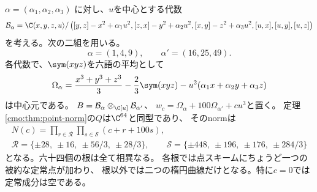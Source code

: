 \begin{example}
\label{cmo:ex:sixty-four}
$\alpha=(\alpha_1,\alpha_2,\alpha_3)$ に対し、$u$を中心とする代数
\[
 \mathcal B_\alpha=\C\langle x,y,z,u\rangle/
 \left([y,z]-x^2+\alpha_1u^2,
       [z,x]-y^2+\alpha_2u^2,
       [x,y]-z^2+\alpha_3u^2,
       [u,x],[u,y],[u,z]\right)
\]
を考える。次の二組を用いる。
\[
 \alpha=(1,4,9),\qquad \alpha'=(16,25,49).
\]
各代数で、$\sym(xyz)$を六語の平均として
\begin{equation}\label{cmo:eq:mixed-center}
 \Omega_\alpha
 =\frac{x^3+y^3+z^3}{3}-\frac23\sym(xyz)
       -u^2(\alpha_1x+\alpha_2y+\alpha_3z)
\end{equation}
は中心元である。
$B=\mathcal B_\alpha\otimes_{\C[u]}\mathcal B_{\alpha'}$、
$w_c=\Omega_\alpha+100\Omega_{\alpha'}+cu^3$と置く。
定理\ref{cmo:thm:point-norm}の$Q$は$\C^{64}$と同型であり、
そのnormは
\begin{equation}\label{cmo:eq:explicit-norm}
 \begin{gathered}
 N(c)=\prod_{r\in\mathcal R}\prod_{s\in\mathcal S}(c+r+100s),\\
 \mathcal R=\{\pm28,\ \pm16,\ \pm56/3,\ \pm28/3\},\qquad
 \mathcal S=\{\pm448,\ \pm196,\ \pm176,\ \pm284/3\}
 \end{gathered}
\end{equation}
となる。六十四個の根は全て相異なる。
各根では点スキームにちょうど一つの被約な定常点が加わり、
根以外では二つの楕円曲線だけとなる。特に$c=0$では定常成分は空である。
\end{example}

